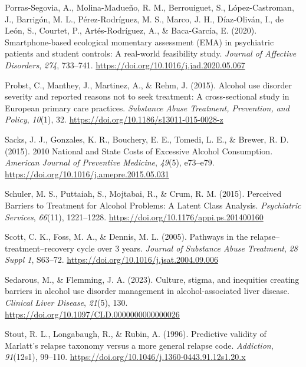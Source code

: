 \documentclass[
  letterpaper,
  DIV=11,
  numbers=noendperiod]{scrartcl}
\newlength{\cslhangindent}
\newenvironment{CSLReferences}[2] %
 {\begin{list}{}{%
  \setlength{\itemindent}{0pt}
  \setlength{\leftmargin}{0pt}
  \setlength{\parsep}{0pt}
  \ifodd #1
   \setlength{\leftmargin}{\cslhangindent}
   \setlength{\itemindent}{-1\cslhangindent}
  \fi
  \setlength{\itemsep}{#2\baselineskip}}}
 {\end{list}}
\begin{document}
\begin{CSLReferences}{1}{0}
Porras-Segovia, A., Molina-Madueño, R. M., Berrouiguet, S.,
López-Castroman, J., Barrigón, M. L., Pérez-Rodríguez, M. S., Marco, J.
H., Díaz-Oliván, I., de León, S., Courtet, P., Artés-Rodríguez, A., \&
Baca-García, E. (2020). Smartphone-based ecological momentary assessment
({EMA}) in psychiatric patients and student controls: {A} real-world
feasibility study. \emph{Journal of Affective Disorders}, \emph{274},
733--741. \url{https://doi.org/10.1016/j.jad.2020.05.067}

Probst, C., Manthey, J., Martinez, A., \& Rehm, J. (2015). Alcohol use
disorder severity and reported reasons not to seek treatment: A
cross-sectional study in {European} primary care practices.
\emph{Substance Abuse Treatment, Prevention, and Policy}, \emph{10}(1),
32. \url{https://doi.org/10.1186/s13011-015-0028-z}

Sacks, J. J., Gonzales, K. R., Bouchery, E. E., Tomedi, L. E., \&
Brewer, R. D. (2015). 2010 {National} and {State Costs} of {Excessive
Alcohol Consumption}. \emph{American Journal of Preventive Medicine},
\emph{49}(5), e73--e79.
\url{https://doi.org/10.1016/j.amepre.2015.05.031}

Schuler, M. S., Puttaiah, S., Mojtabai, R., \& Crum, R. M. (2015).
Perceived {Barriers} to {Treatment} for {Alcohol Problems}: {A Latent
Class Analysis}. \emph{Psychiatric Services}, \emph{66}(11), 1221--1228.
\url{https://doi.org/10.1176/appi.ps.201400160}

Scott, C. K., Foss, M. A., \& Dennis, M. L. (2005). Pathways in the
relapse--treatment--recovery cycle over 3 years. \emph{Journal of
Substance Abuse Treatment}, \emph{28 Suppl 1}, S63--72.
\url{https://doi.org/10.1016/j.jsat.2004.09.006}

Sedarous, M., \& Flemming, J. A. (2023). Culture, stigma, and inequities
creating barriers in alcohol use disorder management in
alcohol-associated liver disease. \emph{Clinical Liver Disease},
\emph{21}(5), 130. \url{https://doi.org/10.1097/CLD.0000000000000026}

Stout, R. L., Longabaugh, R., \& Rubin, A. (1996). Predictive validity
of {Marlatt}'s relapse taxonomy versus a more general relapse code.
\emph{Addiction}, \emph{91}(12s1), 99--110.
\url{https://doi.org/10.1046/j.1360-0443.91.12s1.20.x}


\end{CSLReferences}
\end{document}

